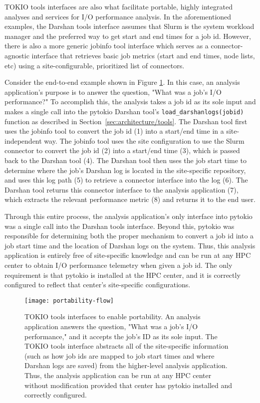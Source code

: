 TOKIO tools interfaces are also what facilitate portable, highly integrated analyses and services for I/O performance analysis.
In the aforementioned examples, the Darshan tools interface assumes that Slurm is the system workload manager and the preferred way to get start and end times for a job id.
However, there is also a more generic jobinfo tool interface which serves as a connector-agnostic interface that retrieves basic job metrics (start and end times, node lists, etc) using a site-configurable, prioritized list of connectors.

Consider the end-to-end example shown in Figure \ref{fig:portability-flow}.  
In this case, an analysis application's purpose is to answer the question, "What was a job's I/O performance?"
To accomplish this, the analysis takes a job id as its sole input and makes a single call into the pytokio Darshan tool's \texttt{load\_darshanlogs(jobid)} function as described in Section~\ref{sec:architecture/tools}.
The Darshan tool first uses the jobinfo tool to convert the job id (1) into a start/end time in a site-independent way.
The jobinfo tool uses the site configuration to use the Slurm connector to convert the job id (2) into a start/end time (3), which is passed back to the Darshan tool (4).
The Darshan tool then uses the job start time to determine where the job's Darshan log is located in the site-specific repository, and uses this log path (5) to retrieve a connector interface into the log (6).
The Darshan tool returns this connector interface to the analysis application (7), which extracts the relevant performance metric (8) and returns it to the end user.

Through this entire process, the analysis application's only interface into pytokio was a single call into the Darshan tools interface.
Beyond this, pytokio was responsible for determining both the proper mechanism to convert a job id into a job start time and the location of Darshan logs on the system.
Thus, this analysis application is entirely free of site-specific knowledge and can be run at any HPC center to obtain I/O performance telemetry when given a job id.
The only requirement is that pytokio is installed at the HPC center, and it is correctly configured to reflect that center's site-specific configurations.

\begin{figure}
    \centering
    \texttt{[image: portability-flow]}
    \caption{TOKIO tools interfaces to enable portability.
    An analysis application answers the question, "What was a job's I/O performance," and it accepts the job's ID as its sole input.
    The TOKIO tools interface abstracts all of the site-specific information (such as how job ids are mapped to job start times and where Darshan logs are saved) from the higher-level analysis application.
    Thus, the analysis application can be run at any HPC center without modification provided that center has pytokio installed and correctly configured.
    }
    \label{fig:portability-flow}
    \vspace{-.2in}
\end{figure}